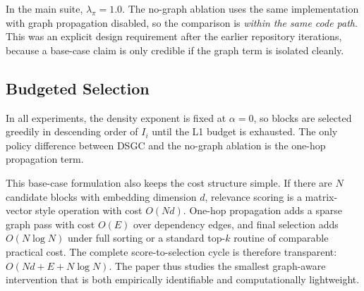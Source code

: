 \documentclass[10pt]{article}
\begin{document}
In the main suite, $\lambda_\pi = 1.0$. The no-graph ablation uses the same implementation with graph propagation disabled, so the comparison is \emph{within the same code path}. This was an explicit design requirement after the earlier repository iterations, because a base-case claim is only credible if the graph term is isolated cleanly.

\subsection{Budgeted Selection}

In all experiments, the density exponent is fixed at $\alpha = 0$, so blocks are selected greedily in descending order of $I_i$ until the L1 budget is exhausted. The only policy difference between DSGC and the no-graph ablation is the one-hop propagation term.

This base-case formulation also keeps the cost structure simple. If there are $N$ candidate blocks with embedding dimension $d$, relevance scoring is a matrix-vector style operation with cost $O(Nd)$. One-hop propagation adds a sparse graph pass with cost $O(E)$ over dependency edges, and final selection adds $O(N \log N)$ under full sorting or a standard top-$k$ routine of comparable practical cost. The complete score-to-selection cycle is therefore transparent: $O(Nd + E + N \log N)$. The paper thus studies the smallest graph-aware intervention that is both empirically identifiable and computationally lightweight.
\end{document}
